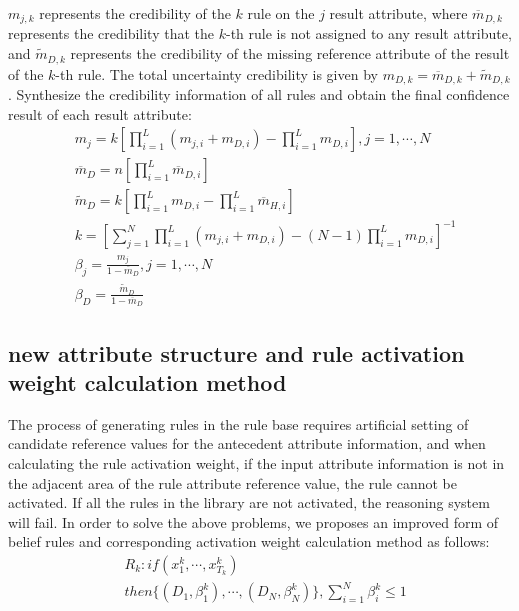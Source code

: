 \documentclass{ieeeaccess}
\begin{document}
$m_{j,k}$ represents the credibility of the $k$ rule on the $j$ result attribute,
where $\overline{m}_{D,k}$ represents the credibility that the $k$-th rule is not assigned to any result attribute,
and $\widetilde{m}_{D,k}$  represents the credibility of the missing reference attribute of the result of the $k$-th rule.
The total uncertainty credibility is given by $m_{D,k}=\overline{m}_{D,k}+\widetilde{m}_{D,k}$.
Synthesize the credibility information of all rules and obtain the final confidence result of each result attribute:
\begin{align}
     & m_j=k[\prod_{i=1}^L(m_{j,i}+m_{D,i})-\prod_{i=1}^Lm_{D,i}],j=1,\cdots,N       \\
     & \overline{m}_D=n[\prod_{i=1}^L\overline{m}_{D,i}]                             \\
     & \widetilde{m}_D=k[\prod_{i=1}^Lm_{D,i}-\prod_{i=1}^L\overline{m}_{H,i}]       \\
     & k=[\sum_{j=1}^N\prod_{i=1}^L(m_{j,i}+m_{D,i})-(N-1)\prod_{i=1}^Lm_{D,i}]^{-1} \\
     & \beta_j=\frac{m_j}{1-\overline{m}_D},j=1,\cdots,N                             \\
     & \beta_D=\frac{\widetilde{m}_D}{1-\overline{m}_D}
\end{align}

\subsection{new attribute structure and rule activation weight calculation method}
The process of generating rules in the rule base requires artificial setting of candidate reference values for the antecedent attribute information,
and when calculating the rule activation weight, if the input attribute information is not in the adjacent area of the rule attribute reference value, the rule cannot be activated.
If all the rules in the library are not activated, the reasoning system will fail. In order to solve the above problems, we proposes an improved form of belief rules and corresponding activation weight calculation method as follows:
\begin{equation}
    \begin{split}
        &R_k:if(x_1^k , \cdots , x_{T_k}^k)\\
        &then\{(D_1,\beta_1^k),\cdots,(D_N,\beta_N^k)\},\sum_{i=1}^N\beta_i^k\leq1
    \end{split}
\end{equation}
\end{document}
